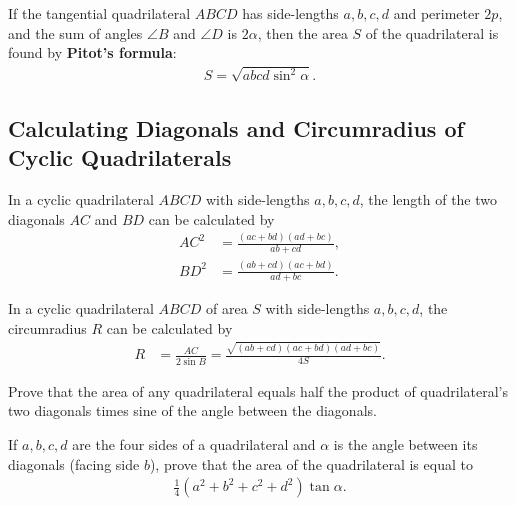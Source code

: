 \documentclass[12pt,a4paper]{memoir}
\theoremstyle{definition}
\begin{document}
	\begin{question}[name={Pitot's Theorem on Area of Tangential Quadrilaterals}]
		If the tangential quadrilateral $ABCD$ has side-lengths $a,b,c,d$ and perimeter $2p$, and the sum of angles $\angle B$ and $\angle D$ is $2\alpha$, then the area $S$ of the quadrilateral is found by \textbf{Pitot’s formula}:
		\begin{align*}
			S = \sqrt{abcd\sin^2\alpha}.
		\end{align*}
	\end{question}





\subsection{Calculating Diagonals and Circumradius of Cyclic Quadrilaterals}

	\begin{question}[name=Trigonometry of Quadrilateral Diagonals]
		In a cyclic quadrilateral $ABCD$ with side-lengths $a,b,c,d$, the length of the two diagonals $AC$ and $BD$ can be calculated by
		\begin{align*}
			AC^2 &= \frac{(ac+bd)(ad+bc)}{ab+cd},\\
			BD^2 &= \frac{(ab+cd)(ac+bd)}{ad+bc}.
		\end{align*}
	\end{question}
	
	\begin{question}[name=Calculating Circumradius of Quadrilateral]
		In a cyclic quadrilateral $ABCD$ of area $S$ with side-lengths $a,b,c,d$, the circumradius $R$ can be calculated by
		\begin{align*}
			R &= \frac{AC}{2\sin B}=\frac{\sqrt{(ab+cd)(ac+bd)(ad+bc)}}{4S}.
		\end{align*}
	\end{question}



\begin{question}
	Prove that the area of any quadrilateral equals half the product of quadrilateral's two diagonals times sine of the angle between the diagonals.
\end{question}


\begin{question}
	If $a,b,c,d$ are the four sides of a quadrilateral and $\alpha$ is the angle between its diagonals (facing side $b$), prove that the area of the quadrilateral is equal to
	\begin{align*}
		\frac{1}{4}\left(a^2+b^2+c^2+d^2\right)\tan \alpha.
	\end{align*}
\end{question}
\end{document}

